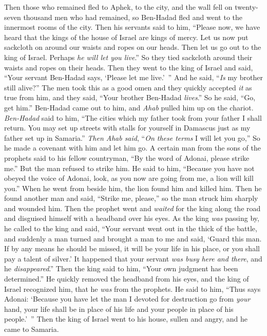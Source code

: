 \begin{biblechapter}
\verse Then those who remained fled to Aphek, to the city, and the wall fell on twenty-seven thousand men who had remained, so Ben-Hadad fled and went to the innermost rooms of the city.
\verse Then his servants said to him, “Please now, we have heard that the kings of the house of Israel are kings of mercy. Let us now put sackcloth on around our waists and ropes on our heads. Then let us go out to the king of Israel. Perhaps \textit{he will let you live}.”
\verse So they tied sackcloth around their waists and ropes on their heads. Then they went to the king of Israel and said, “Your servant Ben-Hadad says, ‘Please let me live.’ ” And he said, “\textit{Is} my brother still alive?”
\verse The men took this as a good omen and they quickly accepted \textit{it} as true from him, and they said, “Your brother Ben-Hadad \textit{lives}.” So he said, “Go, get him.” Ben-Hadad came out to him, and \textit{Ahab} pulled him up on the chariot.
\verse \textit{Ben-Hadad} said to him, “The cities which my father took from your father I shall return. You may set up streets with stalls for yourself in Damascus just as my father set up in Samaria.” \textit{Then Ahab said}, “\textit{On these terms} I will let you go,” So he made a covenant with him and let him go.
\verse A certain man from the sons of the prophets said to his fellow countryman, “By the word of Adonai, please strike me.” But the man refused to strike him.
\verse He said to him, “Because you have not obeyed the voice of Adonai, look, as you now are going from me, a lion will kill you.” When he went from beside him, the lion found him and killed him.
\verse Then he found another man and said, “Strike me, please,” so the man struck him sharply and wounded him.
\verse Then the prophet went and \textit{waited} for the king along the road and disguised himself with a headband over his eyes.
\verse As the king \textit{was} passing by, he called to the king and said, “Your servant went out in the thick of the battle, and suddenly a man turned and brought a man to me and said, ‘Guard this man. If by any means he should be missed, it will be your life in his place, or you shall pay a talent of silver.’
\verse It happened that your servant \textit{was busy here and there}, and he \textit{disappeared}.” Then the king said to him, “Your own judgment has been determined.”
\verse He quickly removed the headband from his eyes, and the king of Israel recognized him, that he \textit{was} from the prophets.
\verse He said to him, “Thus says Adonai: ‘Because you have let the man I devoted for destruction go from \textit{your} hand, your life shall be in place of his life and your people in place of his people.’ ”
\verse Then the king of Israel went to his house, sullen and angry, and he came to Samaria.
\end{biblechapter}

